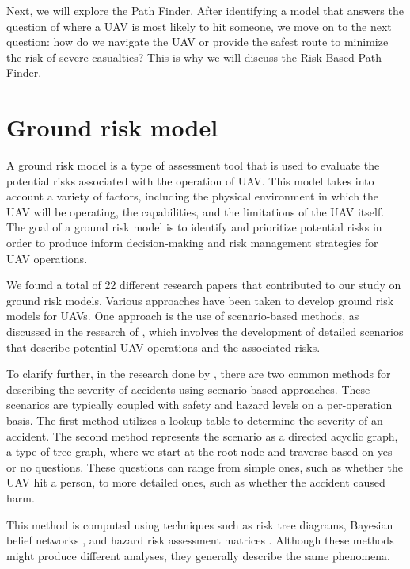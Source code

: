 \documentclass[12pt]{report}
\begin{document}
        Next, we will explore the Path Finder. After identifying a model that answers the question of where a UAV is
        most likely to hit someone, we move on to the next question: how do we navigate the UAV or provide the safest
        route to minimize the risk of severe casualties? This is why we will discuss the Risk-Based Path Finder.

    
    \section{Ground risk model}
        A ground risk model is a type of assessment tool that is used to evaluate the potential risks associated with
        the operation of UAV. This model takes into account a variety of factors, including the physical environment in
        which the UAV will be operating, the capabilities, and the limitations of the UAV itself. The goal of a ground
        risk model is to identify and prioritize potential risks in order to produce inform decision-making and risk
        management strategies for UAV operations.

        We found a total of 22 different research papers that contributed to our study on ground risk models. Various
        approaches have been taken to develop ground risk models for UAVs. One approach is the use of scenario-based
        methods, as discussed in the research of \cite{ancel_real-time_2017}, which involves the development of detailed
        scenarios that describe potential UAV operations and the associated risks.
            
        To clarify further, in the research done by \cite{ancel_real-time_2017}, there are two common methods for
        describing the severity of accidents using scenario-based approaches. These scenarios are typically coupled with
        safety and hazard levels on a per-operation basis. The first method utilizes a lookup table to determine the
        severity of an accident. The second method represents the scenario as a directed acyclic graph, a type of tree
        graph, where we start at the root node and traverse based on yes or no questions. These questions can range from
        simple ones, such as whether the UAV hit a person, to more detailed ones, such as whether the accident caused
        harm.
            
        This method is computed using techniques such as risk tree diagrams, Bayesian belief networks
        \cite{ancel_real-time_2017}, and hazard risk assessment matrices \cite{barr_preliminary_2017}. Although these
        methods might produce different analyses, they generally describe the same phenomena.
            
\end{document}
